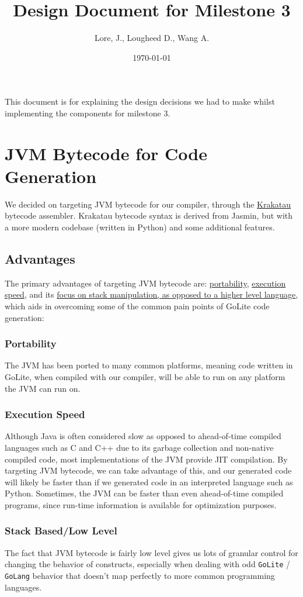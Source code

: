 \documentclass[11pt]{article}
\author{Lore, J., Lougheed D., Wang A.}
\date{\today}
\title{Design Document for Milestone 3}
\begin{document}
\maketitle
\tableofcontents

This document is for explaining the design decisions we had to make
whilst implementing the components for milestone 3.  \newpage
\section{JVM Bytecode for Code Generation}
\label{sec:org5b07bb9}
We decided on targeting JVM bytecode for our compiler, through the
\href{https://github.com/Storyyeller/Krakatau}{Krakatau} bytecode assembler. Krakatau bytecode syntax is derived
from Jasmin, but with a more modern codebase (written in Python) and
some additional features.
\subsection{Advantages}
\label{sec:org470b060}
The primary advantages of targeting JVM bytecode are: \hyperref[sec:org8296e16]{portability}, \hyperref[sec:orgd33314c]{execution speed}, and its \hyperref[sec:orgec85c24]{focus on stack manipulation, as opposed to a
higher level language}, which aids in overcoming some of the common
pain points of GoLite code generation:
\subsubsection{Portability}
\label{sec:org8296e16}
The JVM has been ported to many common platforms, meaning code
written in GoLite, when compiled with our compiler, will be able
to run on any platform the JVM can run on.
\subsubsection{Execution Speed}
\label{sec:orgd33314c}
Although Java is often considered slow as opposed to ahead-of-time
compiled languages such as C and C++ due to its garbage collection
and non-native compiled code, most implementations of the JVM
provide JIT compilation.  By targeting JVM bytecode, we can take
advantage of this, and our generated code will likely be faster
than if we generated code in an interpreted language such as
Python. Sometimes, the JVM can be faster than even ahead-of-time
compiled programs, since run-time information is available for
optimization purposes.
\subsubsection{Stack Based/Low Level}
\label{sec:orgec85c24}
The fact that JVM bytecode is fairly low level gives us lots of
granular control for changing the behavior of constructs,
especially when dealing with odd \texttt{GoLite} / \texttt{GoLang} behavior that
doesn't map perfectly to more common programming languages.
\end{document}
